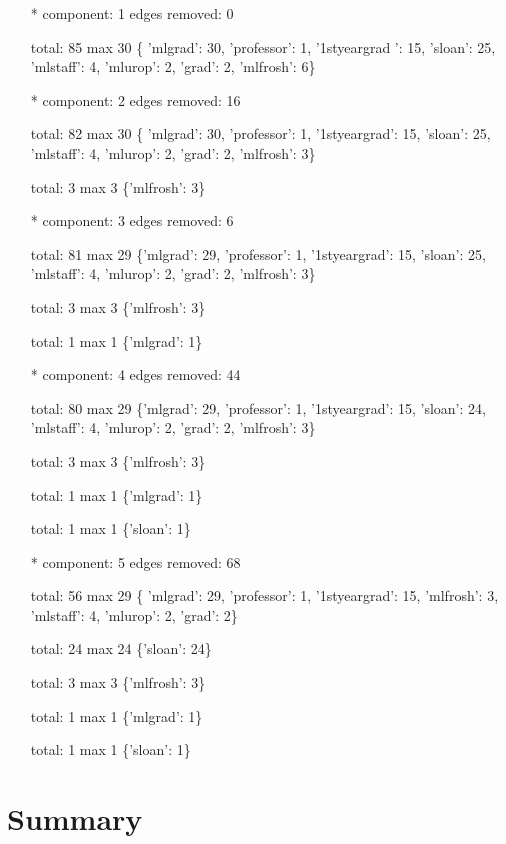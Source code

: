 \documentclass[11pt]{article}
\begin{document}
\begin{itemize}
\item[*]
component: 1 edges removed: 0

total: 85 max 30
\{ 'mlgrad': 30, 'professor': 1, '1styeargrad ': 15,  'sloan': 25, 'mlstaff': 4, 'mlurop': 2, 'grad': 2, 'mlfrosh': 6\}

\item[*]
component: 2 edges removed: 16

total: 82 max 30
\{ 'mlgrad': 30, 'professor': 1, '1styeargrad': 15,  'sloan': 25, 'mlstaff': 4, 'mlurop': 2, 'grad': 2, 'mlfrosh': 3\}

total: 3 max 3
\{'mlfrosh': 3\}

\item[*]
component: 3 edges removed: 6

total: 81 max 29
\{'mlgrad': 29, 'professor': 1, '1styeargrad': 15, 'sloan': 25, 'mlstaff': 4, 'mlurop': 2, 'grad': 2, 'mlfrosh': 3\}

total: 3 max 3
\{'mlfrosh': 3\}

total: 1 max 1
\{'mlgrad': 1\}

\item[*]
component: 4 edges removed: 44

total: 80 max 29
\{'mlgrad': 29, 'professor': 1, '1styeargrad': 15, 'sloan': 24, 'mlstaff': 4, 'mlurop': 2, 'grad': 2, 'mlfrosh': 3\}

total: 3 max 3
\{'mlfrosh': 3\}

total: 1 max 1
\{'mlgrad': 1\}

total: 1 max 1
\{'sloan': 1\}

\item[*]
component: 5 edges removed: 68

total: 56 max 29
\{ 'mlgrad': 29, 'professor': 1, '1styeargrad': 15, 'mlfrosh': 3, 'mlstaff': 4, 'mlurop': 2, 'grad': 2\}

total: 24 max 24
\{'sloan': 24\}

total: 3 max 3
\{'mlfrosh': 3\}

total: 1 max 1
\{'mlgrad': 1\}

total: 1 max 1
\{'sloan': 1\}
\end{itemize}
\section{Summary}\label{summary}



%

\end{document}
